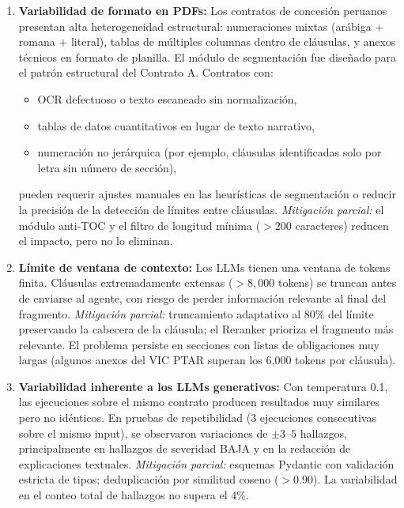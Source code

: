 \begin{enumerate}

    \item \textbf{Variabilidad de formato en PDFs:}
    Los contratos de concesión peruanos presentan alta heterogeneidad
    estructural: numeraciones mixtas (arábiga + romana + literal),
    tablas de múltiples columnas dentro de cláusulas, y anexos técnicos
    en formato de planilla. El módulo de segmentación fue diseñado para el
    patrón estructural del Contrato A. Contratos con:
    \begin{itemize}
        \item OCR defectuoso o texto escaneado sin normalización,
        \item tablas de datos cuantitativos en lugar de texto narrativo,
        \item numeración no jerárquica (por ejemplo, cláusulas identificadas
              solo por letra sin número de sección),
    \end{itemize}
    pueden requerir ajustes manuales en las heurísticas de segmentación
    o reducir la precisión de la detección de límites entre cláusulas.
    \textit{Mitigación parcial:} el módulo anti-TOC y el filtro de longitud
    mínima ($>200$ caracteres) reducen el impacto, pero no lo eliminan.

    \item \textbf{Límite de ventana de contexto:}
    Los LLMs tienen una ventana de tokens finita. Cláusulas extremadamente
    extensas ($> 8{,}000$ tokens) se truncan antes de enviarse al agente,
    con riesgo de perder información relevante al final del fragmento.
    \textit{Mitigación parcial:} truncamiento adaptativo al 80\% del límite
    preservando la cabecera de la cláusula; el Reranker prioriza el fragmento
    más relevante. El problema persiste en secciones con listas de obligaciones
    muy largas (algunos anexos del VIC PTAR superan los 6{,}000 tokens
    por cláusula).

    \item \textbf{Variabilidad inherente a los LLMs generativos:}
    Con temperatura 0.1, las ejecuciones sobre el mismo contrato producen
    resultados muy similares pero no idénticos. En pruebas de repetibilidad
    (3 ejecuciones consecutivas sobre el mismo input), se observaron
    variaciones de $\pm 3$--$5$ hallazgos, principalmente en hallazgos
    de severidad BAJA y en la redacción de explicaciones textuales.
    \textit{Mitigación parcial:} esquemas Pydantic con validación estricta
    de tipos; deduplicación por similitud coseno ($> 0.90$). La
    variabilidad en el conteo total de hallazgos no supera el 4\%.


\end{enumerate}

